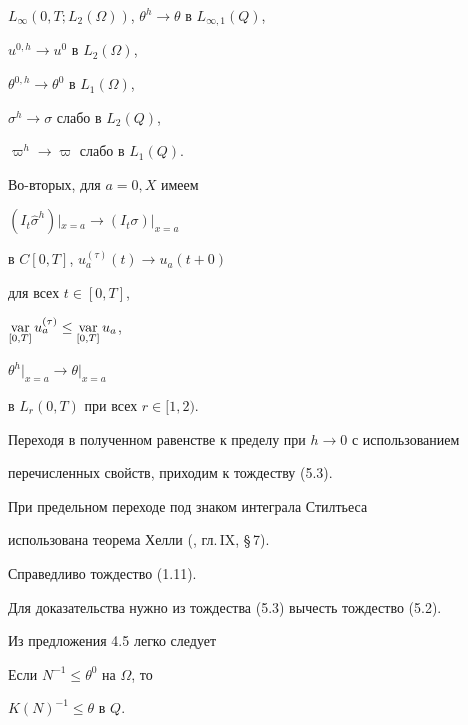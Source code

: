 \documentclass[12pt]{article}
\newcommand{\var}{\operatornamewithlimits{var}}
\theoremstyle{plain} %
\newtheorem{lemm}{\hskip\parindent Лемма}[section]
\theoremstyle{definition}
\newtheorem{corm}{\hskip\parindent Следствие}[section]
\numberwithin{equation}{section}
\begin{document}
\begin{pf}
$L_\infty(0,T; L_2(\Omega))$, $\theta^h\to\theta$ в $L_{\infty,1}(Q)$,


$u^{0,h}\to u^0$ в $L_2(\Omega)$,


$\theta^{0,h}\to \theta^0$ в $L_1(\Omega)$,


$\sigma^h\to\sigma$ слабо в $L_2(Q)$,


$\varpi^h\to \varpi$ слабо в $L_1(Q)$.


Во-вторых, для $a=0,X$ имеем


$(I_t\widehat\sigma^h)|_{x=a}\to (I_t\sigma)|_{x=a}$


в $C[0,T]$, $u^{(\tau)}_a(t)\to u_a(t+0)$


для всех $t\in [0,T]$,


$\var\limits_{[0,T]}u^{(\tau)}_a\le


\var\limits_{[0,T]}u_a$,


$\theta^h\bigr|_{x=a}\to \theta\bigr|_{x=a}$


в $L_r(0,T)$ при всех $r\in [1,2)$.


Переходя в полученном равенстве к пределу при $h\to 0$ с использованием


перечисленных свойств, приходим к тождеству (5.3).


При предельном переходе под знаком интеграла Стилтьеса


использована теорема Хелли (\cite{Nat}, гл.\,IX, \S\,7).


\end{pf}





\begin{corm} Справедливо тождество (1.11).


\end{corm}





Для доказательства нужно из тождества (5.3) вычесть тождество (5.2).





Из предложения 4.5 легко следует





\begin{lemm} Если $N^{-1}\le\theta^0$ на $\Omega$, то


$K(N)^{-1}\le\theta$ в $Q$.


\end{lemm}
\end{document}
